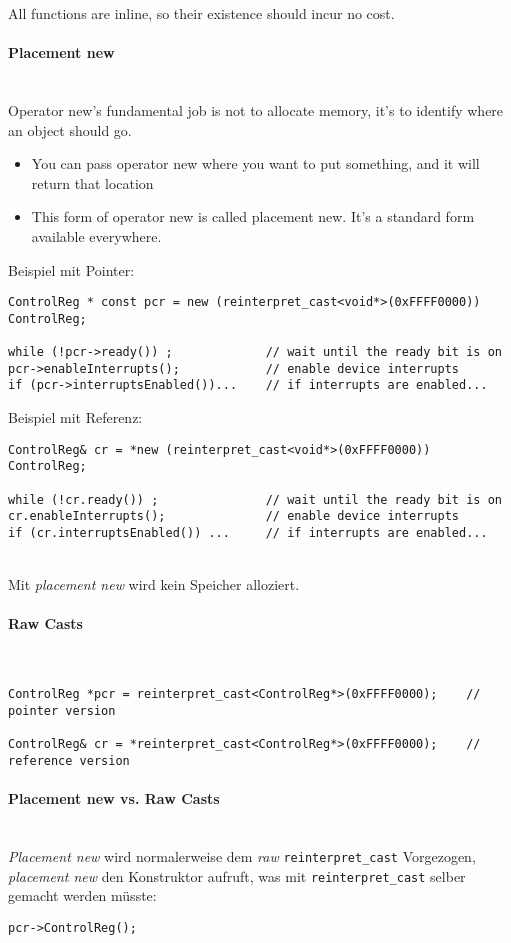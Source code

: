 All functions are inline, so their existence should incur no cost.

\paragraph{Placement new}~\\
Operator new’s fundamental job is not to allocate memory, it’s to identify where an object should go.

\begin{itemize}
	\item You can pass operator new where you want to put something, and it will return that location
	\item This form of operator new is called placement new.
			It’s a standard form available everywhere.
\end{itemize}

Beispiel mit Pointer:
\begin{lstlisting}
ControlReg * const pcr = new (reinterpret_cast<void*>(0xFFFF0000)) ControlReg;

while (!pcr->ready()) ; 			// wait until the ready bit is on
pcr->enableInterrupts(); 			// enable device interrupts
if (pcr->interruptsEnabled())... 	// if interrupts are enabled...

\end{lstlisting}

Beispiel mit Referenz:
\begin{lstlisting}
ControlReg& cr = *new (reinterpret_cast<void*>(0xFFFF0000)) ControlReg;

while (!cr.ready()) ; 				// wait until the ready bit is on
cr.enableInterrupts(); 				// enable device interrupts
if (cr.interruptsEnabled()) ... 	// if interrupts are enabled...
\end{lstlisting}
~ \\
Mit \textit{placement new} wird kein Speicher alloziert.

\paragraph{Raw Casts}~
\begin{lstlisting}
ControlReg *pcr = reinterpret_cast<ControlReg*>(0xFFFF0000);	// pointer version

ControlReg& cr = *reinterpret_cast<ControlReg*>(0xFFFF0000);	// reference version
\end{lstlisting}

\paragraph{Placement new vs. Raw Casts}~\\
\emph{Placement new} wird normalerweise dem \emph{raw} \texttt{reinterpret\_cast} Vorgezogen, \emph{placement new} den Konstruktor aufruft, was mit \texttt{reinterpret\_cast} selber gemacht werden müsste:
\begin{lstlisting}
pcr->ControlReg();
\end{lstlisting}